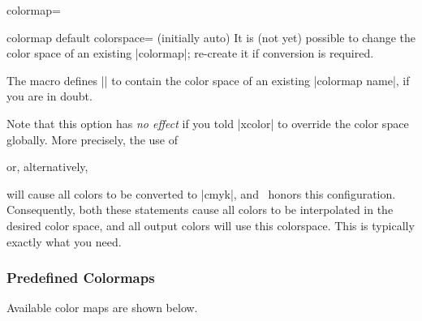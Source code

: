 \begin{pgfplotskey}{colormap=}
\begin{pgfplotskey}{colormap default colorspace= (initially auto)}
	It is (not yet) possible to change the color space of an existing |colormap|; re-create it if conversion is required.

	The macro \declareandlabel{\pgfplotscolormapgetcolorspace} defines |\pgfplotsretval| to contain the color space of an existing |colormap name|, if you are in doubt.

	Note that this option has \emph{no effect} if you told |xcolor| to override the color space globally. More precisely, the use of 
\begin{codeexample}
\usepackage[cmyk]{xcolor}
\end{codeexample}
	or, alternatively,
\begin{codeexample}
\end{codeexample}
	will cause all colors to be converted to |cmyk|, and \PGFPlots\ honors this configuration. Consequently, both these statements cause all colors to be interpolated in the desired color space, and all output colors will use this colorspace. This is typically exactly what you need.

\end{pgfplotskey}

\subsubsection{Predefined Colormaps}
Available color maps are shown below.

\end{pgfplotskey}

